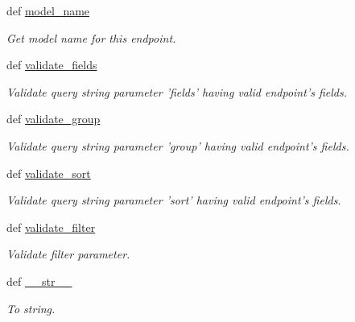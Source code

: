 \begin{DoxyCompactItemize}
def \hyperlink{classtune_1_1management_1_1endpoints_1_1base_1_1TuneManagementBase_a87488fcb698ee6951ce9474c137145e4}{model\-\_\-name}
\begin{DoxyCompactList}\small\item\em Get model name for this endpoint. \end{DoxyCompactList}\item 
def \hyperlink{classtune_1_1management_1_1endpoints_1_1base_1_1TuneManagementBase_a817d9e1554db6d83669848ea01cee3ba}{validate\-\_\-fields}
\begin{DoxyCompactList}\small\item\em Validate query string parameter 'fields' having valid endpoint's fields. \end{DoxyCompactList}\item 
def \hyperlink{classtune_1_1management_1_1endpoints_1_1base_1_1TuneManagementBase_ae60c7ea424b0242e7d54d5b488d85f91}{validate\-\_\-group}
\begin{DoxyCompactList}\small\item\em Validate query string parameter 'group' having valid endpoint's fields. \end{DoxyCompactList}\item 
def \hyperlink{classtune_1_1management_1_1endpoints_1_1base_1_1TuneManagementBase_af064daad44e8aff9af194ef16b5f3c1a}{validate\-\_\-sort}
\begin{DoxyCompactList}\small\item\em Validate query string parameter 'sort' having valid endpoint's fields. \end{DoxyCompactList}\item 
def \hyperlink{classtune_1_1management_1_1endpoints_1_1base_1_1TuneManagementBase_a4212800b1266ce63b27eb5d1558311f2}{validate\-\_\-filter}
\begin{DoxyCompactList}\small\item\em Validate filter parameter. \end{DoxyCompactList}\item 
def \hyperlink{classtune_1_1management_1_1endpoints_1_1base_1_1TuneManagementBase_a39ccb1b99d81cf28d624f02213bd5d52}{\-\_\-\-\_\-str\-\_\-\-\_\-}
\begin{DoxyCompactList}\small\item\em To string. \end{DoxyCompactList}\end{DoxyCompactItemize}
